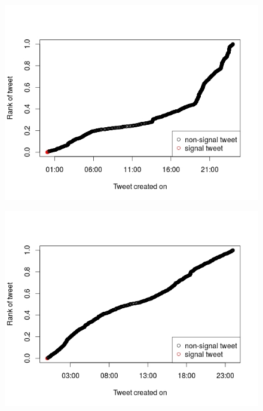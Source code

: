  \begin{figure}[H]
	\centering
	\begin{minipage}{.45\linewidth}
		\includegraphics[width=\linewidth]{images/nrumor1.jpeg}
		\label{nr1}
	\end{minipage}
	\hspace{.05\linewidth}
	\begin{minipage}{.45\linewidth}
		\includegraphics[width=\linewidth]{images/nrumor2.jpeg}
		\label{nr2}
	\end{minipage}
	\centering
	\begin{minipage}{.45\linewidth}

\end{minipage}
\end{figure}
